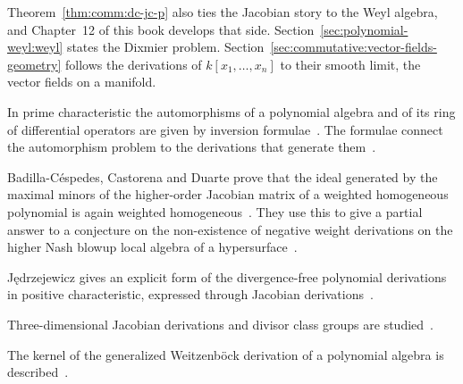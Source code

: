 Theorem~\ref{thm:comm:dc-jc-p} also ties the Jacobian story to the Weyl
algebra, and Chapter~12 of this book develops that side.
Section~\ref{sec:polynomial-weyl:weyl} states the Dixmier problem.
Section~\ref{sec:commutative:vector-fields-geometry} follows the derivations
of $k[x_1,\dots,x_n]$ to their smooth limit, the vector fields on a manifold.

In prime characteristic the automorphisms of a polynomial algebra and of its
ring of differential operators are given by inversion formulae~\cite{WlTheInversionFormulae2008}. The formulae
connect the automorphism problem to the derivations that generate
them~\cite{WlTheInversionFormulae2008}.

Badilla-C\'espedes, Castorena and Duarte prove that the ideal generated by the
maximal minors of the higher-order Jacobian matrix of a weighted homogeneous
polynomial is again weighted homogeneous~\cite{WlHigherJacobianMatrixOfWeighted2025}. They use this to give a partial
answer to a conjecture on the non-existence of negative weight derivations on
the higher Nash blowup local algebra of a
hypersurface~\cite{WlHigherJacobianMatrixOfWeighted2025}.

J\k{e}drzejewicz gives an explicit form of the divergence-free polynomial
derivations in positive characteristic, expressed through Jacobian
derivations~\cite{WlANoteOnDivergenceFreePolynomia2019}.

Three-dimensional Jacobian derivations and divisor class groups are
studied~\cite{WlThreeDimensionalJacobianDeriva2020}.

The kernel of the generalized Weitzenb\"ock derivation of a polynomial algebra
is described~\cite{WlKernelOfGeneralizedWeitzenbCkS2020}.

